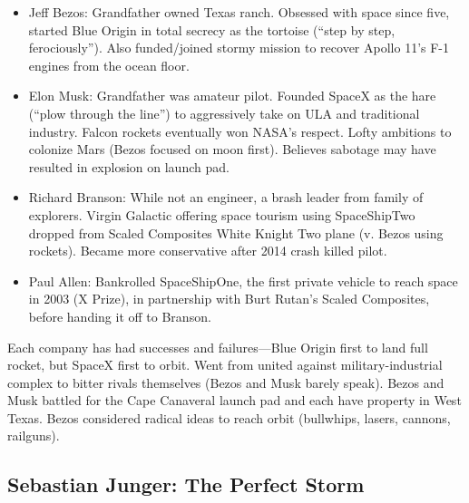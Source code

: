 \documentclass[
]{article}
\begin{document}
\begin{itemize}
\item
  Jeff Bezos: Grandfather owned Texas ranch. Obsessed with space since
  five, started Blue Origin in total secrecy as the tortoise (``step by
  step, ferociously''). Also funded/joined stormy mission to recover
  Apollo 11's F-1 engines from the ocean floor.
\item
  Elon Musk: Grandfather was amateur pilot. Founded SpaceX as the hare
  (``plow through the line'') to aggressively take on ULA and
  traditional industry. Falcon rockets eventually won NASA's respect.
  Lofty ambitions to colonize Mars (Bezos focused on moon first).
  Believes sabotage may have resulted in explosion on launch pad.
\item
  Richard Branson: While not an engineer, a brash leader from family of
  explorers. Virgin Galactic offering space tourism using SpaceShipTwo
  dropped from Scaled Composites White Knight Two plane (v. Bezos using
  rockets). Became more conservative after 2014 crash killed pilot.
\item
  Paul Allen: Bankrolled SpaceShipOne, the first private vehicle to
  reach space in 2003 (X Prize), in partnership with Burt Rutan's Scaled
  Composites, before handing it off to Branson.
\end{itemize}

Each company has had successes and failures---Blue Origin first to land
full rocket, but SpaceX first to orbit. Went from united against
military-industrial complex to bitter rivals themselves (Bezos and Musk
barely speak). Bezos and Musk battled for the Cape Canaveral launch pad
and each have property in West Texas. Bezos considered radical ideas to
reach orbit (bullwhips, lasers, cannons, railguns).

\hypertarget{sebastian-junger-the-perfect-storm}{%
\subsection{Sebastian Junger: The Perfect
Storm}\label{sebastian-junger-the-perfect-storm}}
\end{document}
